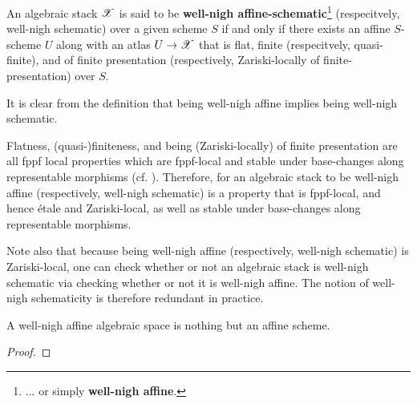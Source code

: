             \begin{definition} \label{def: well_nigh_affine_algebraic_stacks}
                \cite[\href{https://stacks.math.columbia.edu/tag/0DUL}{Tag 0DUL}]{stacks-project} An algebraic stack $\mathscr{X}$ is said to be \textbf{well-nigh affine-schematic}\footnote{... or simply \textbf{well-nigh affine}.} (respecitvely, well-nigh schematic) over a given scheme $S$ if and only if there exists an affine $S$-scheme $U$ along with an atlas $U \to \mathscr{X}$ that is flat, finite (respecitvely, quasi-finite), and of finite presentation (respectively, Zariski-locally of finite-presentation) over $S$. 
            \end{definition}
            \begin{remark}
                It is clear from the definition that being well-nigh affine implies being well-nigh schematic.
            \end{remark}
            \begin{remark} \label{remark: well_nigh_schematicity_is_fppf_local}
                Flatness, (quasi-)finiteness, and being (Zariski-locally) of finite presentation are all fppf local properties which are fppf-local and stable under base-changes along representable morphisms (cf. \cite[\href{https://stacks.math.columbia.edu/tag/02WE}{Tag 02WE}]{stacks-project}). Therefore, for an algebraic stack to be well-nigh affine (respectively, well-nigh schematic) is a property that is fppf-local, and hence \'etale and Zariski-local, as well as stable under base-changes along representable morphisms.
                
                Note also that because being well-nigh affine (respectively, well-nigh schematic) is Zariski-local, one can check whether or not an algebraic stack is well-nigh schematic via checking whether or not it is well-nigh affine. The notion of well-nigh schematicity is therefore redundant in practice.
            \end{remark}
            \begin{proposition} \label{prop: well_nigh_affine_algebraic_spaces}
                A well-nigh affine algebraic space is nothing but an affine scheme. 
            \end{proposition}
                \begin{proof}
                    
                \end{proof}
